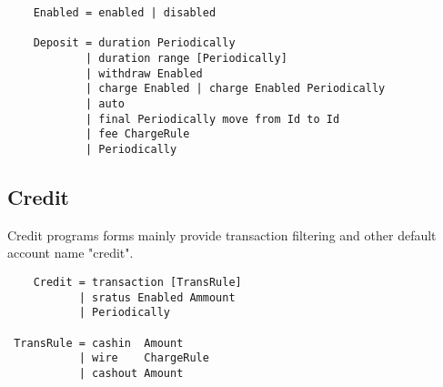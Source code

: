 \vspace{1\baselineskip}
\begin{lstlisting}
    Enabled = enabled | disabled

    Deposit = duration Periodically
            | duration range [Periodically]
            | withdraw Enabled
            | charge Enabled | charge Enabled Periodically
            | auto
            | final Periodically move from Id to Id
            | fee ChargeRule
            | Periodically
\end{lstlisting}
\vspace{1\baselineskip}

\subsection{Credit}

Credit programs forms mainly provide transaction
filtering and other default account name "credit".

\vspace{1\baselineskip}
\begin{lstlisting}
    Credit = transaction [TransRule]
           | sratus Enabled Ammount
           | Periodically

 TransRule = cashin  Amount
           | wire    ChargeRule
           | cashout Amount

\end{lstlisting}
\vspace{1\baselineskip}

